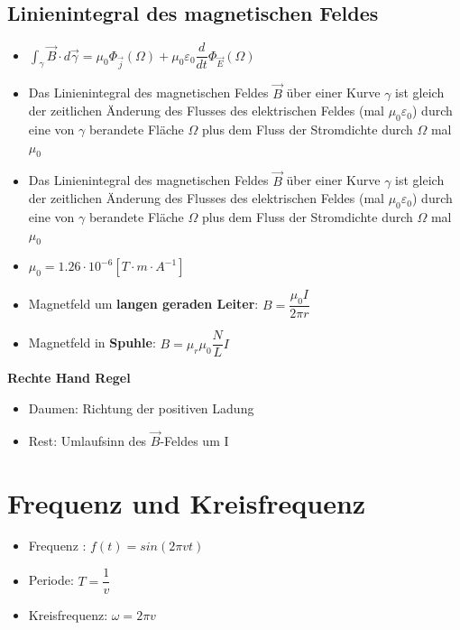 \documentclass[8pt,a4paper]{scrartcl}
\begin{document}
\begin{multicols*}{3}
				\subsection{Linienintegral des magnetischen Feldes}
					\begin{itemize}\itemsep0pt
						\item $\int_{\gamma} \overrightarrow{B} \cdot d \overrightarrow{\gamma} = \mu_{0}\Phi_{\overrightarrow{j}}(\Omega) + \mu_{0}\varepsilon_{0} \dfrac{d}{dt} \Phi_{\overrightarrow{E}}(\Omega)$
						\item Das Linienintegral des magnetischen Feldes $\overrightarrow{B}$ über einer Kurve $\gamma$ ist gleich der zeitlichen Änderung des Flusses des elektrischen Feldes (mal $\mu_{0}\varepsilon_{0}$) durch eine von $\gamma$ berandete Fläche $\Omega$ plus dem Fluss der Stromdichte durch $\Omega$ mal $\mu_{0}$
						\item Das Linienintegral des magnetischen Feldes $\overrightarrow{B}$ über einer Kurve $\gamma$ ist gleich der zeitlichen Änderung des Flusses des elektrischen Feldes (mal $\mu_{0}\varepsilon_{0}$) durch eine von $\gamma$ berandete Fläche $\Omega$ plus dem Fluss der Stromdichte durch $\Omega$ mal $\mu_{0}$
						\item $\mu_{0}= 1.26\cdot 10^{-6}[T\cdot m\cdot A^{-1}]$
						\item Magnetfeld um \textbf{langen geraden Leiter}: $B= \dfrac{\mu_{0}I}{2\pi r}$
						\item Magnetfeld in \textbf{Spuhle}: $B= \mu_{r} \mu_{0} \dfrac{N}{L}I$
					\end{itemize}	
					\textbf{Rechte Hand Regel}
					\begin{itemize}\itemsep0pt
						\item Daumen: Richtung der positiven Ladung
						\item Rest: Umlaufsinn des $\overrightarrow{B}$-Feldes um I
					\end{itemize}		
					
			\section{Frequenz und Kreisfrequenz}
				\begin{itemize}\itemsep0pt
					\item Frequenz : $f(t) = sin(2\pi vt)$
					\item Periode: $T = \dfrac{1}{v}$
					\item Kreisfrequenz: $\omega = 2\pi v$
				\end{itemize}	
				

\end{multicols*}
\end{document}
